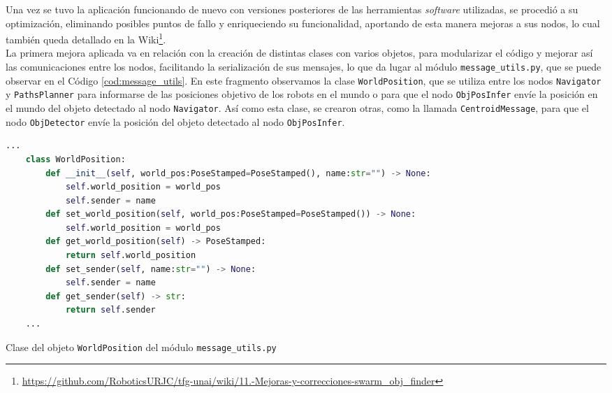 Una vez se tuvo la aplicación funcionando de nuevo con versiones posteriores de
las herramientas \textit{software} utilizadas, se procedió a su optimización,
eliminando posibles puntos de fallo y enriqueciendo su funcionalidad, aportando
de esta manera mejoras a sus nodos, lo cual también queda detallado en la
Wiki\footnote{
\href{https://github.com/RoboticsURJC/tfg-unai/wiki/11.-Mejoras-y-correcciones-del-swarm\_obj\_finder-\%5B30-Sep-\%E2\%80\%90-9-Nov\%5D}{https://github.com/RoboticsURJC/tfg-unai/wiki/11.-Mejoras-y-correcciones-swarm\_obj\_finder}}.
\\

La primera mejora aplicada va en relación con la creación de distintas clases
con varios objetos, para modularizar el código y mejorar así las comunicaciones
entre los nodos, facilitando la serialización de sus mensajes, lo que da lugar
al módulo \texttt{message\_utils.py}, que se puede observar en el Código
\ref{cod:message_utils}.
En este fragmento observamos la clase \verb|WorldPosition|, que se utiliza
entre los nodos \verb|Navigator| y \verb|PathsPlanner| para informarse de
las posiciones objetivo de los robots en el mundo o para que el nodo
\verb|ObjPosInfer| envíe la posición en el mundo del objeto detectado al nodo
\verb|Navigator|.
Así como esta clase, se crearon otras, como la llamada \verb|CentroidMessage|,
para que el nodo \verb|ObjDetector| envíe la posición del objeto detectado al
nodo \verb|ObjPosInfer|.
\\

\begin{code}[h!]
  \begin{lstlisting}[language=Python]
    ...
    class WorldPosition:
        def __init__(self, world_pos:PoseStamped=PoseStamped(), name:str="") -> None:
            self.world_position = world_pos
            self.sender = name
        def set_world_position(self, world_pos:PoseStamped=PoseStamped()) -> None:
            self.world_position = world_pos
        def get_world_position(self) -> PoseStamped:
            return self.world_position
        def set_sender(self, name:str="") -> None:
            self.sender = name
        def get_sender(self) -> str:
            return self.sender
    ...
  \end{lstlisting}
\caption[Clase del objeto \texttt{WorldPosition} del módulo \texttt{message\_utils.py}]{Clase del objeto \texttt{WorldPosition} del módulo \texttt{message\_utils.py}}
\label{cod:message_utils}
\end{code}

